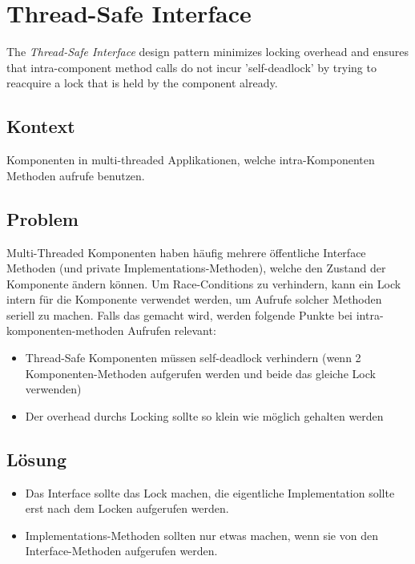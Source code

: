 \section{Thread-Safe Interface}


The \emph{Thread-Safe Interface} design pattern minimizes locking overhead and ensures that intra-component method calls do not incur 'self-deadlock' by trying to reacquire a lock that is held by the component already.

\subsection*{Kontext}

Komponenten in multi-threaded Applikationen, welche intra-Komponenten Methoden aufrufe benutzen.

\subsection*{Problem}

Multi-Threaded Komponenten haben häufig mehrere öffentliche Interface Methoden (und private Implementations-Methoden), welche den Zustand der Komponente ändern können.
Um Race-Conditions zu verhindern, kann ein Lock intern für die Komponente verwendet werden, um Aufrufe solcher Methoden seriell zu machen.
Falls das gemacht wird, werden folgende Punkte bei intra-komponenten-methoden Aufrufen relevant:

\begin{itemize}
	\item Thread-Safe Komponenten müssen self-deadlock verhindern (wenn 2 Komponenten-Methoden aufgerufen werden und beide das gleiche Lock verwenden)
	\item Der overhead durchs Locking sollte so klein wie möglich gehalten werden
\end{itemize}

\subsection*{Lösung}

\begin{itemize}
	\item Das Interface sollte das Lock machen, die eigentliche Implementation sollte erst nach dem Locken aufgerufen werden.
	\item Implementations-Methoden sollten nur etwas machen, wenn sie von den Interface-Methoden aufgerufen werden.
\end{itemize}

